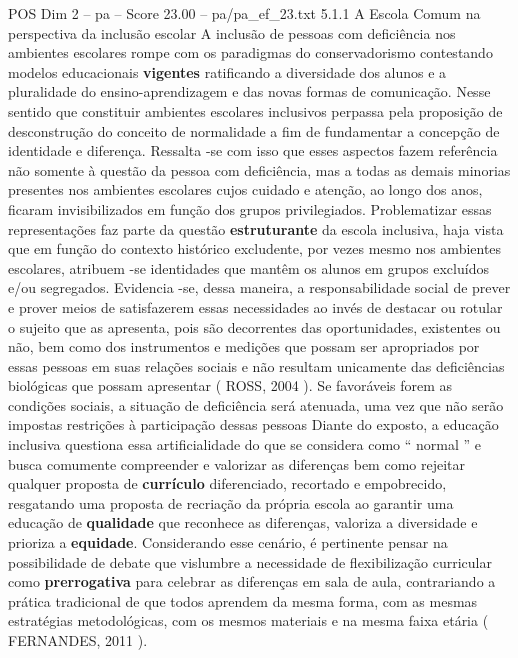 \begin{textsample}{POS Dim 2 – pa – Score 23.00 – pa/pa\_ef\_23.txt}  \label{ex:f2_pos_070}
5.1.1 A Escola Comum na perspectiva da inclusão escolar A inclusão de pessoas com deficiência nos ambientes escolares rompe com os paradigmas do conservadorismo contestando modelos educacionais \textbf{vigentes} ratificando a diversidade dos alunos e a pluralidade do ensino-aprendizagem e das novas formas de comunicação.
Nesse sentido que constituir ambientes escolares inclusivos perpassa pela proposição de desconstrução do conceito de normalidade a fim de fundamentar a concepção de identidade e diferença.
Ressalta -se com isso que esses aspectos fazem referência não somente à questão da pessoa com deficiência, mas a todas as demais minorias presentes nos ambientes escolares cujos cuidado e atenção, ao longo dos anos, ficaram invisibilizados em função dos grupos privilegiados.
Problematizar essas representações faz parte da questão \textbf{estruturante} da escola inclusiva, haja vista que em função do contexto histórico excludente, por vezes mesmo nos ambientes escolares, atribuem -se identidades que mantêm os alunos em grupos excluídos e/ou segregados.
Evidencia -se, dessa maneira, a responsabilidade social de prever e prover meios de satisfazerem essas necessidades ao invés de destacar ou rotular o sujeito que as apresenta, pois são decorrentes das oportunidades, existentes ou não, bem como dos instrumentos e medições que possam ser apropriados por essas pessoas em suas relações sociais e não resultam unicamente das deficiências biológicas que possam apresentar ( ROSS, 2004 ).
Se favoráveis forem as condições sociais, a situação de deficiência será atenuada, uma vez que não serão impostas restrições à participação dessas pessoas Diante do exposto, a educação inclusiva questiona essa artificialidade do que se considera como “ normal ” e busca comumente compreender e valorizar as diferenças bem como rejeitar qualquer proposta de \textbf{currículo} diferenciado, recortado e empobrecido, resgatando uma proposta de recriação da própria escola ao garantir uma educação de \textbf{qualidade} que reconhece as diferenças, valoriza a diversidade e prioriza a \textbf{equidade}.
Considerando esse cenário, é pertinente pensar na possibilidade de debate que vislumbre a necessidade de flexibilização curricular como \textbf{prerrogativa} para celebrar as diferenças em sala de aula, contrariando a prática tradicional de que todos aprendem da mesma forma, com as mesmas estratégias metodológicas, com os mesmos materiais e na mesma faixa etária ( FERNANDES, 2011 ).

\end{textsample}
